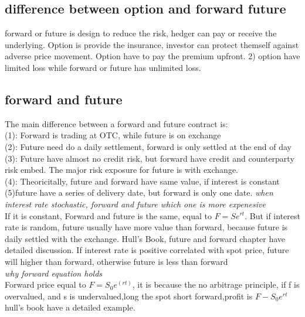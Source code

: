 \documentclass[a4paper,11pt]{article}
\begin{document}
\subsection{difference between option and forward future}
forward or future is design to reduce the risk, hedger can pay or receive the underlying. Option is provide the insurance, investor can protect themself against adverse price movement. Option have to pay the premium upfront. 2) option have limited loss while forward or future has unlimited loss.
\subsection{forward and future}
The main difference between a forward and future contract is:\\
(1): Forward is trading at OTC, while future is on exchange\\
(2): Future need do a daily settlement, forward is only settled at the end of day\\
(3): Future have almost no credit risk, but forward have credit and counterparty risk embed. The major risk exposure for future is with exchange. \\
(4): Theoricitally, future and forward have same value, if interest is constant\\
(5)future have a series of delivery date, but forward is only one date.
{\em when interest rate stochastic, forward and future which one is more expenesive}\\
If it is constant, Forward and future is the same, equal to $F=Se^{rt}$. But if interest rate is random, future usually have more value than forward, because future is daily settled with the exchange. Hull's Book, future and forward chapter have detailed discussion. If interest rate is positive correlated with spot price, future will higher than forward, otherwise future is less than forward\\
{\em why forward equation holds}\\
Forward price equal to $F=S_0e^{(rt)}$, it is because the no arbitrage principle, if f is overvalued, and s is undervalued,long the spot short forward,profit is $F-S_0e^{rt}$ hull's book have a detailed example.
\end{document}
